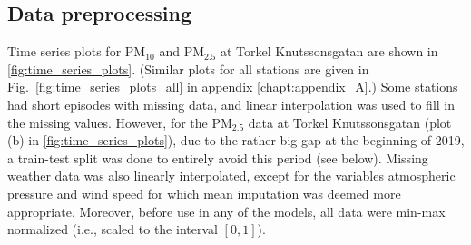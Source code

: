 
\subsection{Data preprocessing}
Time series plots for PM$_{10}$ and PM$_{2.5}$ at Torkel Knutssonsgatan are shown in \vref{fig:time_series_plots}. (Similar plots for all stations are given in Fig.\ \ref{fig:time_series_plots_all} in appendix \ref{chapt:appendix_A}.)
Some stations had short episodes with missing data, and linear interpolation was used to fill in the missing values. However, for the PM$_{2.5}$ data at Torkel Knutssonsgatan (plot (b) in \vref{fig:time_series_plots}), due to the rather big gap at the beginning of 2019, a train-test split was done to entirely avoid this period (see below). Missing weather data was also linearly interpolated, except for the variables atmospheric pressure and wind speed for which mean imputation was deemed more appropriate. Moreover, before use in any of the models, all data were min-max normalized (i.e., scaled to the interval $[0,1]$). 

